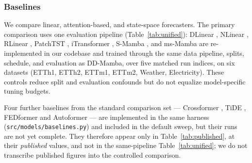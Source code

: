 \documentclass[review,12pt]{elsarticle}
\newcommand{\model}{DD-Mamba}
\begin{document}
\begin{table}[tb]
\centering
\caption{Benchmark datasets, their cross-channel coupling, and where
\model{} places its capacity. $\overline{|r|}$: mean absolute pairwise
Pearson correlation between channels on the training split (--- = raw file
unavailable in our build environment).}
\label{tab:datasets}
\end{table}

\subsubsection{Baselines}
We compare linear, attention-based, and state-space forecasters. The primary
comparison uses one evaluation pipeline (Table~\ref{tab:unified}): DLinear
\cite{dlinear}, NLinear \cite{dlinear}, RLinear \cite{rlinear}, PatchTST
\cite{patchtst}, iTransformer \cite{itransformer}, S-Mamba \cite{smamba}, and
ms-Mamba \cite{msmamba} are re-implemented in our codebase and trained
through the same data pipeline, splits, schedule, and evaluation as
\model{}, over five matched run indices, on six datasets (ETTh1, ETTh2,
ETTm1, ETTm2, Weather, Electricity). These controls reduce split and
evaluation confounds but do not equalize model-specific tuning budgets.

Four further baselines from the standard comparison set --- Crossformer
\cite{crossformer}, TiDE \cite{tide}, FEDformer \cite{fedformer} and
Autoformer \cite{autoformer} --- are implemented in the same harness
(\texttt{src/models/baselines.py}) and included in the default sweep, but
their runs are not yet complete. They therefore appear only in
Table~\ref{tab:published}, at their \emph{published} values, and not in the
same-pipeline Table~\ref{tab:unified}; we do not transcribe published figures
into the controlled comparison.
\end{document}
